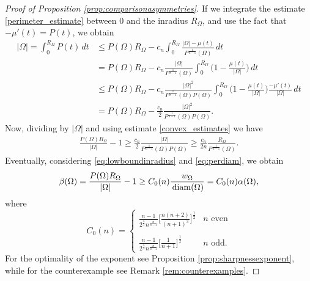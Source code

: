 \documentclass[oneside,a4paper,11pt,notitlepage]{article}
\newcommand{\abs}[1]{{\left|#1\right|}}
\theoremstyle{definition}
\theoremstyle{plain}
\theoremstyle{definition}
\DeclareMathOperator{\diam}{\, \textup{diam}}
\begin{document}
\begin{proof}[Proof of Proposition \ref{prop:comparisonasymmetries}]
If we integrate the estimate \eqref{perimeter_estimate} between $0$ and the inradius $R_\Omega$, and use the fact that $-\mu'(t)=P(t)$, we obtain
\begin{equation*}
\begin{split}
    \abs{\Omega}= \int_0^{R_\Omega}P(t)\,dt&\le P(\Omega)R_\Omega-c_n \int_0^{R_\Omega}\frac{\abs{\Omega} - \mu(t)}{P^{\frac{1}{n-1}}(\Omega)}\,dt\\
    &=P(\Omega)R_\Omega-c_n\frac{\abs{\Omega}}{P^{\frac{1}{n-1}}(\Omega)}\int_0^{R_\Omega}\bigg(1-\frac{\mu(t)}{\abs{\Omega}}\bigg)\,dt\\
    &\le P(\Omega)R_\Omega-c_n\frac{\abs{\Omega}^2}{P^{\frac{1}{n-1}}(\Omega)P(\Omega)}\int_0^{R_\Omega}\bigg(1-\frac{\mu(t)}{\abs{\Omega}}\bigg)\frac{-\mu'(t)}{\abs{\Omega}}\,dt\\
    &= P(\Omega)R_\Omega-\frac{c_n}{2}\frac{\abs{\Omega}^2}{P^{\frac{1}{n-1}}(\Omega)P(\Omega)}.
    \end{split}
\end{equation*}
Now, dividing by $\abs{\Omega}$ and using estimate \eqref{convex_estimates} we have
\begin{equation*}
    \begin{split}
        \frac{P(\Omega)R_\Omega}{\abs{\Omega}}-1 \ge \frac{c_n}{2}\frac{\abs{\Omega}}{P^{\frac{1}{n-1}}(\Omega)P(\Omega)}\ge \frac{c_n}{2n}\frac{R_\Omega}{P^{\frac{1}{n-1}}(\Omega)}.
    \end{split}
\end{equation*}
Eventually, considering \eqref{eq:lowboundinradius} and \eqref{eq:perdiam}, we obtain
\begin{equation*}
    \beta(\Omega)=\frac{P(\Omega)R_\Omega}{\abs{\Omega}}-1 \ge C_0(n)\frac{w_\Omega}{\diam(\Omega)}= C_0(n)\alpha(\Omega),
\end{equation*}
where
\begin{equation*}
    \displaystyle C_0(n)=\begin{cases}
     \displaystyle{\frac{n-1}{2^{\frac52}n^{\frac{n}{n-1}}}\bigg[\frac{n(n+2)}{(n+1)^3}\bigg]^\frac{1}{2}} & n \,\, \text{even}\\ \\
    \displaystyle{\frac{n-1}{2^{\frac52}n^{\frac{n}{n-1}}}\bigg[\frac{1}{n+1}\bigg]^\frac{1}{2}} & n \,\, \text{odd}.
    \end{cases}
\end{equation*}
For the optimality of the exponent  see Proposition \ref{prop:sharpnessexponent}, while for the counterexample see Remark \ref{rem:counterexamples}.
\end{proof}
\end{document}

